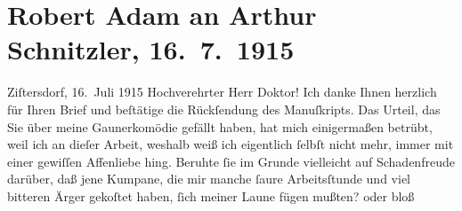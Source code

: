 

         
         \renewcommand{\erwaehntePersonen}{Personen: Robert Adam}
         \renewcommand{\erwaehnteOrte}{Orte: Wien, Zistersdorf}
         \renewcommand{\erwaehnteWerke}{Werke: Die Fackel, Gesellschaft [Eine Gaunerkomödie], Rechtsphilosophie, Sprüche}
               \section[Robert Adam an Arthur Schnitzler, 16. 7. 1915]{ Robert Adam an Arthur Schnitzler, 16. 7. 1915}\nopagebreak{}\rehead{ }\begin{ledgroupsized}[t]{13cm}\normalsize\beginnumbering{} \toendnotes[C]{\smallbreak\pagebreak[2]} 
\toendnotes[C]{\smallbreak}\pstart
           \raggedleft{}{\pb}Ziſtersdorf, 16. Juli 1915\pend
           \pstart{}Hochverehrter Herr Doktor!\pend\pstart
           Ich danke Ihnen herzlich für Ihren Brief und beſtätige die Rückſendung des Manuſkripts.\pend
           \pstart
           Das Urteil, das Sie über meine Gaunerkomödie gefällt haben, hat mich einigermaßen betrübt, weil ich an
               dieſer Arbeit, weshalb weiß ich eigentlich ſelbſt nicht mehr, immer mit einer
               gewiſſen Affenliebe hing. Beruhte ſie im Grunde vielleicht auf Schadenfreude darüber,
               daß jene Kumpane, die mir manche ſaure Arbeitsſtunde und viel bitteren Ärger gekoſtet
               haben, ſich meiner Laune fügen mußten? oder bloß \label{T_L02215-1v}
\end{ledgroupsized}
